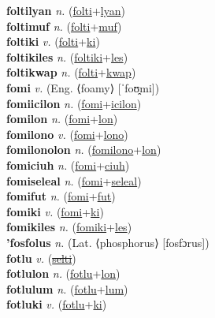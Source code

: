 \textbf{foltilyan} \textit{n.} (\hyperref[folti]{folti}+\hyperref[lyan]{lyan})
 \label{foltilyan} \\
\textbf{foltimuf} \textit{n.} (\hyperref[folti]{folti}+\hyperref[muf]{muf})
 \label{foltimuf} \\
\textbf{foltiki} \textit{v.} (\hyperref[folti]{folti}+\hyperref[ki]{ki})
 \label{foltiki} \\
\textbf{foltikiles} \textit{n.} (\hyperref[foltiki]{foltiki}+\hyperref[les]{les})
 \label{foltikiles} \\
\textbf{foltikwap} \textit{n.} (\hyperref[folti]{folti}+\hyperref[kwap]{kwap})
 \label{foltikwap} \\
\textbf{fomi} \textit{v.} (Eng. ⟨foamy⟩ [ˈfoʊ̯mi])
 \label{fomi} \\
\textbf{fomiicilon} \textit{n.} (\hyperref[fomi]{fomi}+\hyperref[icilon]{icilon})
 \label{fomiicilon} \\
\textbf{fomilon} \textit{n.} (\hyperref[fomi]{fomi}+\hyperref[lon]{lon})
 \label{fomilon} \\
\textbf{fomilono} \textit{v.} (\hyperref[fomi]{fomi}+\hyperref[lono]{lono})
 \label{fomilono} \\
\textbf{fomilonolon} \textit{n.} (\hyperref[fomilono]{fomilono}+\hyperref[lon]{lon})
 \label{fomilonolon} \\
\textbf{fomiciuh} \textit{n.} (\hyperref[fomi]{fomi}+\hyperref[ciuh]{ciuh})
 \label{fomiciuh} \\
\textbf{fomiseleal} \textit{n.} (\hyperref[fomi]{fomi}+\hyperref[seleal]{seleal})
 \label{fomiseleal} \\
\textbf{fomifut} \textit{n.} (\hyperref[fomi]{fomi}+\hyperref[fut]{fut})
 \label{fomifut} \\
\textbf{fomiki} \textit{v.} (\hyperref[fomi]{fomi}+\hyperref[ki]{ki})
 \label{fomiki} \\
\textbf{fomikiles} \textit{n.} (\hyperref[fomiki]{fomiki}+\hyperref[les]{les})
 \label{fomikiles} \\
\textbf{'fosfolus} \textit{n.} (Lat. ⟨phosphorus⟩ [fosfɔrus])
 \label{'fosfolus} \\
\textbf{fotlu} \textit{v.} (\hyperref[selti]{\sout{selti}})
 \label{fotlu} \\
\textbf{fotlulon} \textit{n.} (\hyperref[fotlu]{fotlu}+\hyperref[lon]{lon})
 \label{fotlulon} \\
\textbf{fotlulum} \textit{n.} (\hyperref[fotlu]{fotlu}+\hyperref[lum]{lum})
 \label{fotlulum} \\
\textbf{fotluki} \textit{v.} (\hyperref[fotlu]{fotlu}+\hyperref[ki]{ki})
